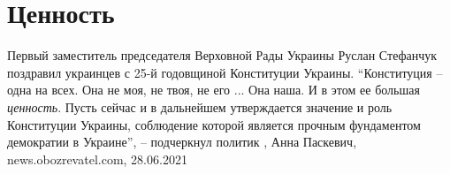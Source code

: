  
 
 
 
 
\chapter{Ценность}
\label{sec:slova.cennost}

Первый заместитель председателя Верховной Рады Украины Руслан Стефанчук
поздравил украинцев с 25-й годовщиной Конституции Украины. \enquote{Конституция – одна
на всех. Она не моя, не твоя, не его ... Она наша. И в этом ее большая
\emph{ценность}. Пусть сейчас и в дальнейшем утверждается значение и роль Конституции
Украины, соблюдение которой является прочным фундаментом демократии в Украине},
– подчеркнул политик
, 
Анна Паскевич, news.obozrevatel.com, 28.06.2021

